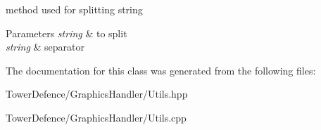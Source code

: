 method used for splitting string 


\begin{DoxyParams}{Parameters}
{\em string} & to split \\
\hline
{\em string} & separator \\
\hline
\end{DoxyParams}


The documentation for this class was generated from the following files\+:\begin{DoxyCompactItemize}
\item 
Tower\+Defence/\+Graphics\+Handler/Utils.\+hpp\item 
Tower\+Defence/\+Graphics\+Handler/Utils.\+cpp\end{DoxyCompactItemize}
